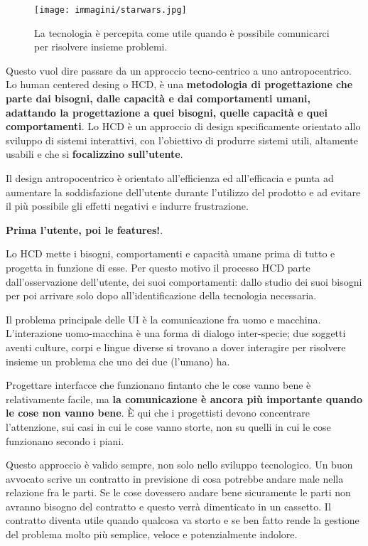 \begin{figure}[!htb]
	\centering
	\texttt{[image: immagini/starwars.jpg]}
	\caption{La tecnologia è percepita come utile quando è possibile comunicarci per risolvere insieme problemi.}
\end{figure}

Questo vuol dire passare da un approccio tecno-centrico a uno antropocentrico. Lo human centered desing o HCD, è una \textbf{metodologia di progettazione
che parte dai bisogni, dalle capacità e dai comportamenti umani, adattando la progettazione a quei bisogni, quelle capacità e quei comportamenti}.
Lo HCD è un approccio di design specificamente orientato allo sviluppo di sistemi interattivi, con l'obiettivo di produrre sistemi utili,
altamente usabili e che si \textbf{focalizzino sull'utente}.

Il design antropocentrico è orientato all'efficienza ed all'efficacia e punta ad aumentare la soddisfazione dell'utente durante
l'utilizzo del prodotto e ad evitare il più possibile gli effetti negativi e indurre frustrazione.

\vspace{\baselineskip}
\textbf{Prima l'utente, poi le features!}.
\vspace{\baselineskip}

Lo HCD mette i bisogni, comportamenti e capacità umane prima di tutto e progetta in funzione di esse. Per questo motivo il processo HCD parte
dall'osservazione dell'utente, dei suoi comportamenti: dallo studio dei suoi bisogni per poi arrivare solo dopo all'identificazione
della tecnologia necessaria.

Il problema principale delle UI è la comunicazione fra uomo e macchina. L'interazione uomo-macchina è una forma di dialogo inter-specie; due soggetti
aventi culture, corpi e lingue diverse si trovano a dover interagire per risolvere insieme un problema che uno dei due (l'umano) ha.

Progettare interfacce che funzionano fintanto che le cose vanno bene è relativamente facile, ma \textbf{la comunicazione è ancora più importante
quando le cose non vanno bene}. È qui che i progettisti devono concentrare l'attenzione, sui casi in cui le cose vanno storte, non su quelli in cui
le cose funzionano secondo i piani.

Questo approccio è valido sempre, non solo nello sviluppo tecnologico. Un buon avvocato scrive un contratto in previsione di cosa potrebbe andare
male nella relazione fra le parti. Se le cose dovessero andare bene sicuramente le parti non avranno bisogno del contratto e questo verrà dimenticato
in un cassetto. Il contratto diventa utile quando qualcosa va storto e se ben fatto rende la gestione del problema molto più semplice, veloce e
potenzialmente indolore. 

